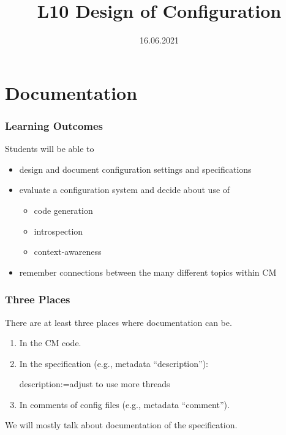 

\title{L10 Design of Configuration}
\date{16.06.2021}






\section{Documentation}

\begin{frame}
	\frametitle{Learning Outcomes}
	Students will be able to

	\begin{itemize}
	\item design and document configuration settings and specifications
	\item evaluate a configuration system and decide about use of
	\begin{itemize}
	\item code generation
	\item introspection
	\item context-awareness
	\end{itemize}
	\item remember connections between the many different topics within CM
	\end{itemize}
\end{frame}

\begin{frame}[fragile]
	\frametitle{Three Places}

	There are at least three places where documentation can be.

	\begin{enumerate}
	\item In the CM code.
	\item In the specification (e.g., metadata ``description''):
	\begin{code}
	  description:=adjust to use more threads
	\end{code}
	\item In comments of config files (e.g., metadata ``comment'').
	\end{enumerate}

	\vspace{1cm}

	We will mostly talk about documentation of the specification.
\end{frame}


\begin{frame}
\end{frame}

